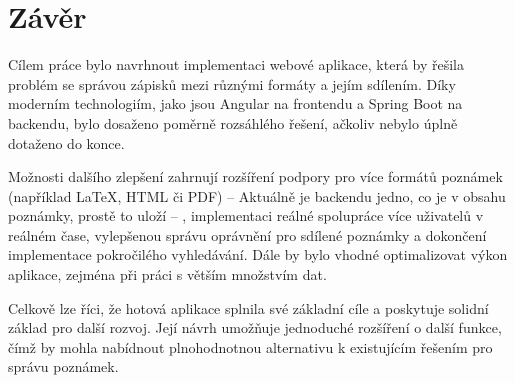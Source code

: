 \section{Závěr}

Cílem práce bylo navrhnout implementaci webové aplikace, která by řešila
problém se správou zápisků mezi různými formáty a jejím sdílením. Díky moderním
technologiím, jako jsou Angular na frontendu a Spring Boot na backendu, bylo
dosaženo poměrně rozsáhlého řešení, ačkoliv nebylo úplně dotaženo do konce.

Možnosti dalšího zlepšení zahrnují rozšíření podpory pro více formátů poznámek
(například LaTeX, HTML či PDF) -- Aktuálně je backendu jedno, co je v obsahu
poznámky, prostě to uloží -- , implementaci reálné spolupráce více uživatelů v
reálném čase, vylepšenou správu oprávnění pro sdílené poznámky a dokončení
implementace pokročilého vyhledávání. Dále by bylo vhodné optimalizovat výkon
aplikace, zejména při práci s větším množstvím dat.

Celkově lze říci, že hotová aplikace splnila své základní cíle a poskytuje
solidní základ pro další rozvoj. Její návrh umožňuje jednoduché rozšíření o
další funkce, čímž by mohla nabídnout plnohodnotnou alternativu k existujícím
řešením pro správu poznámek.
